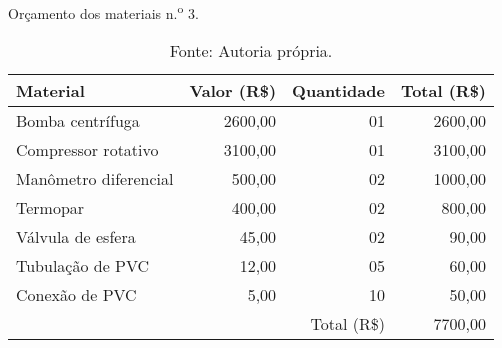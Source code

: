 \begin{table}[htb]%
\caption{Orçamento dos materiais n.\textsuperscript{o} 3.}%
\label{tab:tab5}%
\begin{tabularx}{\textwidth}{@{\extracolsep{\fill}}lrrr}%
\toprule
Material              & \multicolumn{1}{c}{Valor (R\$)} & \multicolumn{1}{c}{Quantidade}  & \multicolumn{1}{c}{Total (R\$)} \\ \midrule
Bomba centrífuga      & 2600,00                         & 01                              & 2600,00                         \\
Compressor rotativo   & 3100,00                         & 01                              & 3100,00                         \\
Manômetro diferencial & 500,00                          & 02                              & 1000,00                         \\
Termopar              & 400,00                          & 02                              & 800,00                          \\
Válvula de esfera     & 45,00                           & 02                              & 90,00                           \\
Tubulação de PVC      & 12,00                           & 05                              & 60,00                           \\
Conexão de PVC        & 5,00                            & 10                              & 50,00                           \\ \midrule
                      &                                 & \multicolumn{1}{r}{Total (R\$)} & 7700,00                         \\ \bottomrule
\end{tabularx}
\caption*{Fonte: Autoria própria.}%
\end{table}
